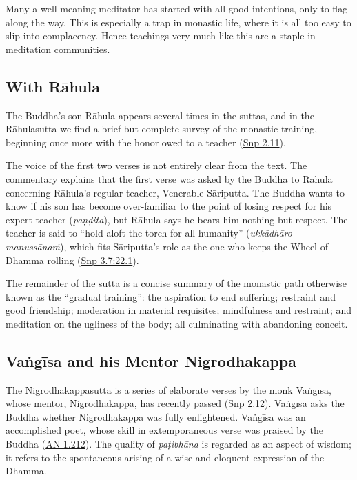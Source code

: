 \documentclass[12pt,openany]{book}%
\begin{document}
Many a well-meaning meditator has started with all good intentions, only to flag along the way. This is especially a trap in monastic life, where it is all too easy to slip into complacency. Hence teachings very much like this are a staple in meditation communities.

\subsection*{With \textsanskrit{Rāhula}}

The Buddha’s son \textsanskrit{Rāhula} appears several times in the suttas, and in the \textsanskrit{Rāhulasutta} we find a brief but complete survey of the monastic training, beginning once more with the honor owed to a teacher (\href{https://suttacentral.net/snp2.11/en/sujato}{Snp 2.11}).

The voice of the first two verses is not entirely clear from the text. The commentary explains that the first verse was asked by the Buddha to \textsanskrit{Rāhula} concerning \textsanskrit{Rāhula}’s regular teacher, Venerable \textsanskrit{Sāriputta}. The Buddha wants to know if his son has become over-familiar to the point of losing respect for his expert teacher (\textit{\textsanskrit{paṇḍita}}), but \textsanskrit{Rāhula} says he bears him nothing but respect. The teacher is said to “hold aloft the torch for all humanity” (\textit{\textsanskrit{ukkādhāro} \textsanskrit{manussānaṁ}}), which fits \textsanskrit{Sāriputta}’s role as the one who keeps the Wheel of Dhamma rolling (\href{https://suttacentral.net/snp3.7/en/sujato\#22.1}{Snp 3.7:22.1}).

The remainder of the sutta is a concise summary of the monastic path otherwise known as the “gradual training”: the aspiration to end suffering; restraint and good friendship; moderation in material requisites; mindfulness and restraint; and meditation on the ugliness of the body; all culminating with abandoning conceit.

\subsection*{\textsanskrit{Vaṅgīsa} and his Mentor Nigrodhakappa}

The Nigrodhakappasutta is a series of elaborate verses by the monk \textsanskrit{Vaṅgīsa}, whose mentor, Nigrodhakappa, has recently passed (\href{https://suttacentral.net/snp2.12/en/sujato}{Snp 2.12}). \textsanskrit{Vaṅgīsa} asks the Buddha whether Nigrodhakappa was fully enlightened. \textsanskrit{Vaṅgīsa} was an accomplished poet, whose skill in extemporaneous verse was praised by the Buddha (\href{https://suttacentral.net/an1.212/en/sujato}{AN 1.212}). The quality of \textit{\textsanskrit{paṭibhāna}} is regarded as an aspect of wisdom; it refers to the spontaneous arising of a wise and eloquent expression of the Dhamma.
\end{document}
